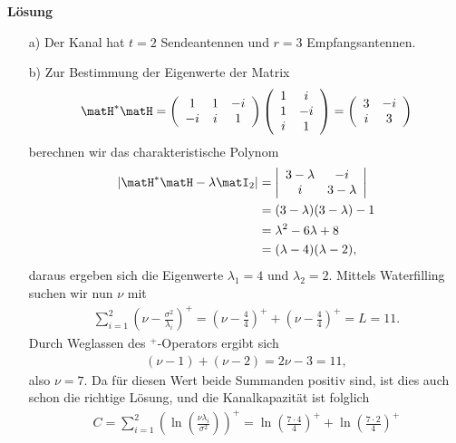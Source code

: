 \bf Lösung \rm

\begin{itemize}
\item[a)] Der Kanal hat $t=2$ Sendeantennen und $r=3$ Empfangsantennen.
\item[b)] Zur Bestimmung der Eigenwerte der Matrix
\begin{align*}
\matH^*\matH=\left(\begin{array}{ccc}
1 & 1 & -i \\
-i & i & 1  \\
\end{array}\right)\left(\begin{array}{cc}
1 & i \\
1 & -i \\
i & 1 \\
\end{array}\right)=\left(\begin{array}{cc}
3 & -i \\
i & 3 \\
\end{array}\right)
\end{align*}
berechnen wir das charakteristische Polynom
\begin{align*}
\left|\matH^*\matH-\lambda\matI_2\right|&=\left|\begin{array}{cc}
3-\lambda & -i \\
i & 3-\lambda \\
\end{array}\right| \\
&=(3-\lambda)(3-\lambda)-1 \\
&=\lambda^2-6\lambda +8 \\
&=(\lambda-4)(\lambda-2),
\end{align*}
daraus ergeben sich die Eigenwerte $\lambda_1=4$ und $\lambda_2=2$.
Mittels Waterfilling suchen wir nun
$\nu$ mit
\begin{align*}
\sum_{i=1}^2\left(\nu-\frac{\sigma^2}{\lambda_i}\right)^+=\left(\nu-\frac{4}{4}\right)^++\left(\nu-\frac{4}{4}\right)^+=L=11.
\end{align*}
Durch Weglassen des $^+$-Operators ergibt sich
\begin{align*}
(\nu-1)+(\nu-2)=2\nu-3=11,
\end{align*}
also $\nu=7$. Da für diesen Wert beide Summanden positiv sind, ist dies auch schon die richtige
Lösung, und die Kanalkapazität ist folglich
\begin{align*}
C=\sum_{i=1}^2\left(\ln\left(\frac{\nu\lambda_i}{\sigma^2}\right)\right)^+
=\ln\left(\frac{7\cdot4}{4}\right)^+ + \ln\left(\frac{7\cdot2}{4}\right)^+ 

\end{align*}
\end{itemize}
